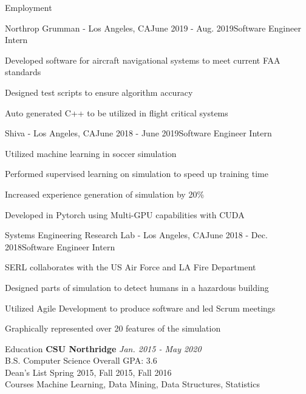 \documentclass{resume}
\begin{document}
\begin{rSection}{Employment}
    \begin{rSubsection}{Northrop Grumman - Los Angeles, CA}{June 2019 - Aug. 2019}{Software Engineer Intern}{}
        \item Developed software for aircraft navigational systems to meet current FAA standards
        \item Designed test scripts to ensure algorithm accuracy
        \item Auto generated C++ to be utilized in flight critical systems
    \end{rSubsection}
    \begin{rSubsection}{Shiva - Los Angeles, CA}{June 2018 - June 2019}{Software Engineer Intern}{}
        \item Utilized machine learning in soccer simulation
        \item Performed supervised learning on simulation to speed up training time
        \item Increased experience generation of simulation by 20\%
        \item Developed in Pytorch using Multi-GPU capabilities with CUDA
    \end{rSubsection}
    \begin{rSubsection}{Systems Engineering Research Lab - Los Angeles, CA}{June 2018 - Dec. 2018}{Software Engineer Intern}{}
        \item SERL collaborates with the US Air Force and LA Fire Department
        \item Designed parts of simulation to detect humans in a hazardous building
        \item Utilized Agile Development to produce software and led Scrum meetings
        \item Graphically represented over 20 features of the simulation
    \end{rSubsection}
\end{rSection}

\begin{rSection}{Education}
    {\bf CSU Northridge} \hfill {\em Jan. 2015 - May 2020} 
    \\ B.S. Computer Science \hfill { Overall GPA: 3.6 }
    \\ Dean's List \hfill {Spring 2015, Fall 2015, Fall 2016}
    \\ Courses \hfill {Machine Learning, Data Mining, Data Structures, Statistics}
\end{rSection}
\end{document}
